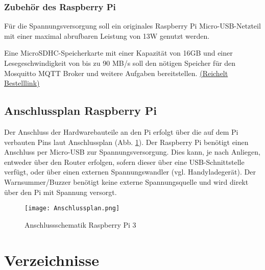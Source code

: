 \documentclass[a4paper,12pt]{article}
\newcommand{\linkmicrosd}{https://www.reichelt.de/sg/de/microsdhc-speicherkarte-16gb-transcend-class-10-uhs-i-ts16gusdcu1-p220722.html}
\begin{document}
\subsubsection{Zubehör des Raspberry Pi}
Für die Spannungsversorgung soll ein originales Raspberry Pi Micro-USB-Netzteil mit einer maximal abrufbaren Leistung von 13W genutzt werden.\par

Eine MicroSDHC-Speicherkarte mit einer Kapazität von 16GB und einer Lesegeschwindigkeit von bis zu 90 MB/s soll den nötigen Speicher für den Mosquitto MQTT Broker und weitere Aufgaben bereitstellen. \href{\linkmicrosd}{(Reichelt Bestelllink)} 

\newpage

\subsection{Anschlussplan Raspberry Pi}
Der Anschluss der Hardwarebauteile an den Pi erfolgt über die auf dem Pi verbauten Pins laut Anschlussplan (Abb. \ref{Anschlussplan}). Der Raspberry Pi benötigt einen Anschluss per Micro-USB zur Spannungsversorgung. Dies kann, je nach Anliegen, entweder über den Router erfolgen, sofern dieser über eine USB-Schnittstelle verfügt, oder über einen externen Spannungswandler (vgl. Handyladegerät). Der Warnsummer/Buzzer benötigt keine externe Spannungsquelle und wird direkt über den Pi mit Spannung versorgt.

\begin{figure}[H]	%
\begin{center}
\texttt{[image: Anschlussplan.png]}
\caption{Anschlussschematik Raspberry Pi 3}
\label{Anschlussplan}
\end{center}
\end{figure}

\newpage

\section{Verzeichnisse}
\listoffigures %
\listoftables
{}
\end{document}
